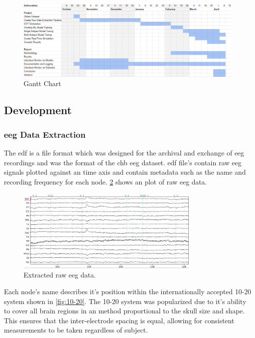 \documentclass[12pt]{article}
\begin{document}
\begin{figure}[H]
\includegraphics[width=\textwidth]{gantt}
\centering
\caption{Gantt Chart}
\label{fig:gantt}
\end{figure}




\subsection{Development}


\subsubsection{\acrfull{eeg} Data Extraction}

The \acrfull{edf} \cite{kemp1992simple} is a file format which was designed for the archival and exchange of \acrshort{eeg} recordings \cite{kemp2013european} and was the format of the \acrshort{chb} \acrshort{eeg} dataset. \acrshort{edf} file's contain raw \acrshort{eeg} signals plotted against an time axis and contain metadata such as the name and recording frequency for each node. \ref{fig:eegPlot} shows an plot of raw \acrshort{eeg} data. 

\begin{figure}[H]
\includegraphics[width=0.8\textwidth]{eeg_raw_continuous}
\centering
\caption{Extracted raw \acrshort{eeg} data. \protect\cite{neuraldatascience2024}}
\label{fig:eegPlot}
\end{figure}

Each node's name describes it's position within the internationally accepted 10-20 system shown in \ref{fig:10-20}. The 10-20 system was popularized due to it's ability to cover all brain regions in an method proportional to the skull size and shape. This ensures that the inter-electrode spacing is equal, allowing for consistent measurements to be taken regardless of subject. \cite{morley201610}
\end{document}
